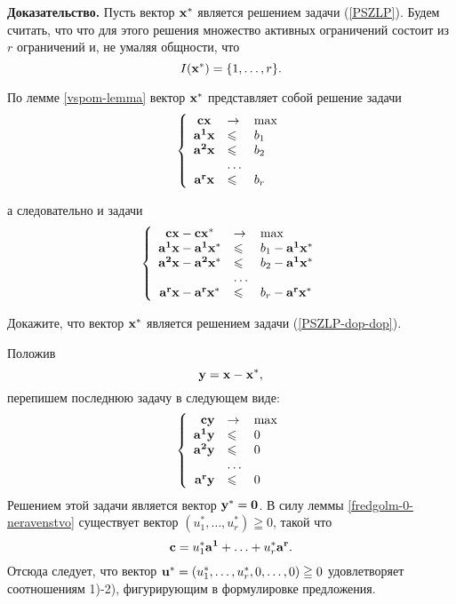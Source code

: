     \textbf{Доказательство.} Пусть вектор $\mathbf{x}^{*}$
    является решением задачи (\ref{PSZLP}). Будем считать, что
    что для этого решения множество активных ограничений состоит из
    $r$ ограничений и, не умаляя общности, что
    \[I(\mathbf{x^{*}})=\{1,\ldots,r\}.\]

    По лемме \ref{vspom-lemma} вектор $\mathbf{x}^{*}$ представляет
    собой решение задачи
\begin{equation}\label{PSZLP-dop-dop-0}
    \left\{
    \begin{array}{cll}
    \mathbf{c}\mathbf{x}  &\to & \max\\
    \mathbf{a^{1}}\mathbf{x}  &\leqslant& b_1 \\
    \mathbf{a^{2}}\mathbf{x}&\leqslant& b_2\\
                      & \ldots &\\
    \mathbf{a^{r}}\mathbf{x} &\leqslant& b_r\\
\end{array} \right.
\end{equation}



а следовательно и задачи 
\begin{equation}\label{PSZLP-dop-dop}
\left\{
\begin{array}{cll}
\mathbf{c}\mathbf{x}-\mathbf{c}\mathbf{x^{*}}  &\to & \max\\
\mathbf{a^{1}}\mathbf{x}-\mathbf{a^{1}}\mathbf{x^{*}}  &\leqslant& b_1 -\mathbf{a^{1}}\mathbf{x^{*}}\\
\mathbf{a^{2}}\mathbf{x}-\mathbf{a^{2}}\mathbf{x^{*}}  &\leqslant& b_2-\mathbf{a^{1}}\mathbf{x^{*}}  \\
                      & \ldots &\\
\mathbf{a^{r}}\mathbf{x}-\mathbf{a^{r}}\mathbf{x^{*}}  &\leqslant& b_r-\mathbf{a^{r}}\mathbf{x^{*}} \\
\end{array} \right.
\end{equation}

\begin{exer}
    Докажите, что вектор $\mathbf{x}^{*}$ является
    решением задачи (\ref{PSZLP-dop-dop}).
\end{exer}


Положив
\[\mathbf{y}=\mathbf{x}-\mathbf{x^{*}},\]
перепишем последнюю задачу в следующем виде:
\begin{equation}\label{PSZLP-dop-0}
\left\{
\begin{array}{rll}
\mathbf{c}\mathbf{y} &\to & \max\\
\mathbf{a^{1}}\mathbf{y} &\leqslant& 0 \\
\mathbf{a^{2}}\mathbf{y} &\leqslant& 0\\
                      & \ldots &\\
\mathbf{a^{r}}\mathbf{y}  &\leqslant& 0\\
\end{array} \right.
\end{equation}
Решением этой задачи является вектор $\mathbf{y^{*}}=\mathbf{0}$. В силу
леммы \ref{fredgolm-0-neravenstvo} существует вектор
$(u_{1}^{*},\ldots,u_{r}^{*})\geqq0$, такой что
\[\mathbf{c}=u_{1}^{*}\mathbf{a^{1}}+\ldots+u_{r}^{*}\mathbf{a^{r}}.\]
Отсюда следует, что вектор
$\mathbf{u^{*}}=(u_{1}^{*},\ldots,u_{r}^{*},0,\ldots,0)\geqq0$
удовлетворяет соотношениям 1)-2), фигурирующим в формулировке
предложения.

